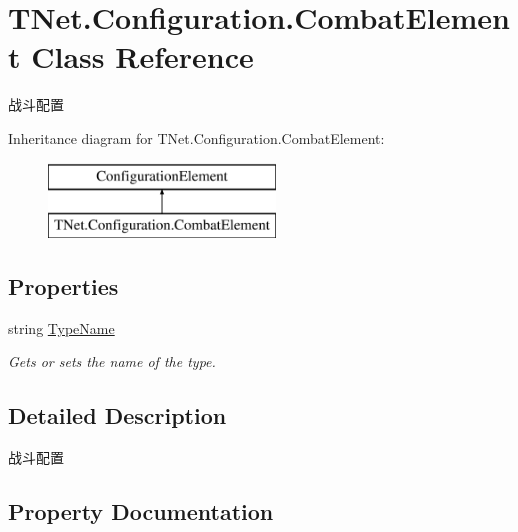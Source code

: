 \hypertarget{class_t_net_1_1_configuration_1_1_combat_element}{}\section{T\+Net.\+Configuration.\+Combat\+Element Class Reference}
\label{class_t_net_1_1_configuration_1_1_combat_element}


战斗配置  


Inheritance diagram for T\+Net.\+Configuration.\+Combat\+Element\+:\begin{figure}[H]
\begin{center}
\leavevmode
\includegraphics[height=2.000000cm]{class_t_net_1_1_configuration_1_1_combat_element}
\end{center}
\end{figure}
\subsection*{Properties}
\begin{DoxyCompactItemize}
\item 
string \mbox{\hyperlink{class_t_net_1_1_configuration_1_1_combat_element_a430b3c398b67af4b90ca61a82bc01d89}{Type\+Name}}
\begin{DoxyCompactList}\small\item\em Gets or sets the name of the type. \end{DoxyCompactList}\end{DoxyCompactItemize}


\subsection{Detailed Description}
战斗配置 



\subsection{Property Documentation}
\mbox{\label{class_t_net_1_1_configuration_1_1_combat_element_a430b3c398b67af4b90ca61a82bc01d89}} 
